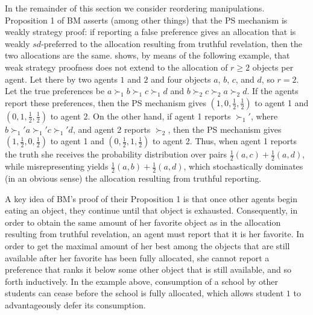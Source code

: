 \documentclass[12pt, A4paper]{article}
\theoremstyle{definition}
\begin{document}
In the remainder of this section we consider reordering manipulations.  Proposition 1 of BM asserts (among other things) that the PS mechanism is weakly strategy proof: if reporting a false preference gives an allocation that is weakly  $sd$-preferred to the allocation resulting from truthful revelation, then the two allocations are the same. \cite{kojima09mss} shows, by means of the following example, that weak strategy proofness does not extend to the allocation of $r \ge 2$ objects per agent.  Let there by two agents $1$ and $2$ and four objects $a$, $b$, $c$, and $d$, so $r = 2$.  Let the true preferences be $a \succ_1 b \succ_1 c \succ_1 d$ and $b \succ_2 c \succ_2 a \succ_2 d$.  If the agents report these preferences, then the PS mechanism gives $(1,0,\tfrac12,\tfrac12)$ to agent 1 and $(0,1,\tfrac12,\tfrac12)$ to agent 2.  On the other hand, if agent 1 reports $\succ_1'$, where $b \succ_1' a \succ_1' c \succ_1' d$, and agent 2 reports $\succ_2$, then  the PS mechanism gives $(1,\tfrac12,0,\tfrac12)$ to agent 1 and $(0,\tfrac12,1,\tfrac12)$ to agent 2.  Thus, when agent 1 reports the truth she receives the probability distribution  over pairs $\tfrac12 (a,c) + \tfrac12 (a,d)$, while misrepresenting yields $\tfrac12 (a,b) + \tfrac12 (a,d)$, which stochastically dominates (in an obvious sense) the allocation resulting from truthful reporting. 

A key idea of BM's proof of their Proposition 1 is that once other agents begin eating an object, they continue until that object is exhausted.  Consequently, in order to obtain the same amount of her favorite object as in the allocation resulting from truthful revelation, an agent must report that it is her favorite.  In order to get the maximal amount of her best among the objects that are still available after her favorite has been fully allocated, she cannot report a preference that ranks it below some other object that is still available, and so forth inductively.  In the example above, consumption of a school by other students can cease before the school is fully allocated, which allows student $1$ to advantageously defer its consumption.
\end{document}
